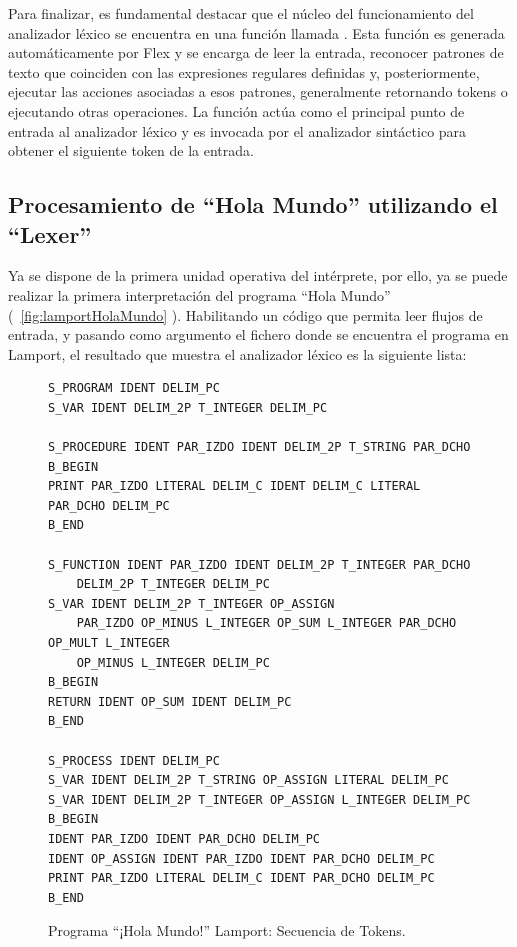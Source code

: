 Para finalizar, es fundamental destacar que el núcleo del funcionamiento del analizador léxico se encuentra en una función llamada . Esta función es generada automáticamente por Flex y se encarga de leer la entrada, reconocer patrones de texto que coinciden con las expresiones regulares definidas y, posteriormente, ejecutar las acciones asociadas a esos patrones, generalmente retornando tokens o ejecutando otras operaciones. La función  actúa como el principal punto de entrada al analizador léxico y es invocada por el analizador sintáctico para obtener el siguiente token de la entrada.

\newpage

\subsection{Procesamiento de ``Hola Mundo'' utilizando el ``Lexer''}
Ya se dispone de la primera unidad operativa del intérprete, por ello, ya se puede realizar la primera interpretación del programa ``Hola Mundo'' (~\ref{fig:lamportHolaMundo} ). Habilitando un código que permita leer flujos de entrada, y pasando como argumento el fichero donde se encuentra el programa en Lamport, el resultado que muestra el analizador léxico es la siguiente lista:

\begin{figure}[h]
\begin{verbatim}
S_PROGRAM IDENT DELIM_PC
S_VAR IDENT DELIM_2P T_INTEGER DELIM_PC 

S_PROCEDURE IDENT PAR_IZDO IDENT DELIM_2P T_STRING PAR_DCHO 
B_BEGIN 
PRINT PAR_IZDO LITERAL DELIM_C IDENT DELIM_C LITERAL PAR_DCHO DELIM_PC
B_END

S_FUNCTION IDENT PAR_IZDO IDENT DELIM_2P T_INTEGER PAR_DCHO 
    DELIM_2P T_INTEGER DELIM_PC 
S_VAR IDENT DELIM_2P T_INTEGER OP_ASSIGN
    PAR_IZDO OP_MINUS L_INTEGER OP_SUM L_INTEGER PAR_DCHO OP_MULT L_INTEGER 
    OP_MINUS L_INTEGER DELIM_PC
B_BEGIN 
RETURN IDENT OP_SUM IDENT DELIM_PC 
B_END 

S_PROCESS IDENT DELIM_PC 
S_VAR IDENT DELIM_2P T_STRING OP_ASSIGN LITERAL DELIM_PC
S_VAR IDENT DELIM_2P T_INTEGER OP_ASSIGN L_INTEGER DELIM_PC
B_BEGIN 
IDENT PAR_IZDO IDENT PAR_DCHO DELIM_PC 
IDENT OP_ASSIGN IDENT PAR_IZDO IDENT PAR_DCHO DELIM_PC 
PRINT PAR_IZDO LITERAL DELIM_C IDENT PAR_DCHO DELIM_PC 
B_END
\end{verbatim}
\caption{Programa ``¡Hola Mundo!'' Lamport: Secuencia de Tokens.}
\label{fig:tokensHolaMundo}
\end{figure}

